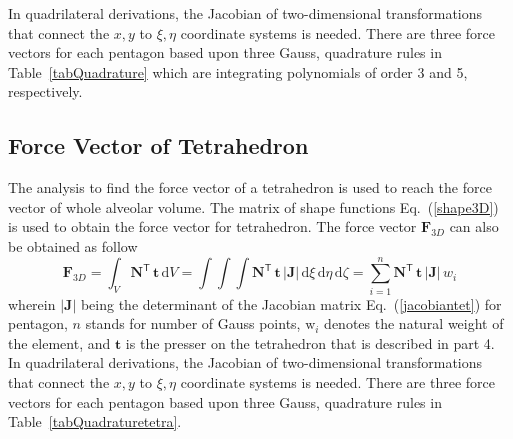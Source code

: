 In quadrilateral derivations, the Jacobian of two-dimensional transformations that connect the ${x, y}$ to ${\xi, \eta}$ coordinate systems is needed. 
There are three force vectors for each pentagon based upon three Gauss, quadrature rules in Table~\ref{tabQuadrature} which are integrating polynomials of order 3 and 5, respectively. 

\subsection{Force Vector of Tetrahedron}

The analysis to find the force vector of a tetrahedron is used to reach the force vector of whole alveolar volume.
The matrix of shape functions Eq.~(\ref{shape3D}) is used to obtain the force vector for tetrahedron.
The force vector $\mathbf{F}_{3D}$ can also be obtained as follow
\begin{equation}
\mathbf{F}_{3D} = \int_{V} \mathbf{N}^{\mathsf{T}} \, \mathbf{t} \, \mathrm{d} V = \int \int \int \mathbf{N}^{\mathsf{T}} \, \mathbf{t} \,|\mathbf{J}| \, \mathrm{d} \xi \, \mathrm{d} \eta \, \mathrm{d} \zeta = \sum_{i=1}^{n} \mathbf{N}^{\mathsf{T}} \, \mathbf{t} \,|\mathbf{J}| \, w_i
\end{equation}
wherein $|\mathbf{J}|$ being the determinant of the Jacobian matrix Eq.~(\ref{jacobiantet}) for pentagon, $n$ stands for number of Gauss points, $\mathrm{w}_i$ denotes the natural weight of the element, and $\mathbf{t}$ is the presser on the tetrahedron that is described in part 4.
In quadrilateral derivations, the Jacobian of two-dimensional transformations that connect the ${x, y}$ to ${\xi, \eta}$ coordinate systems is needed. 
There are three force vectors for each pentagon based upon three Gauss, quadrature rules in Table~\ref{tabQuadraturetetra}. 



